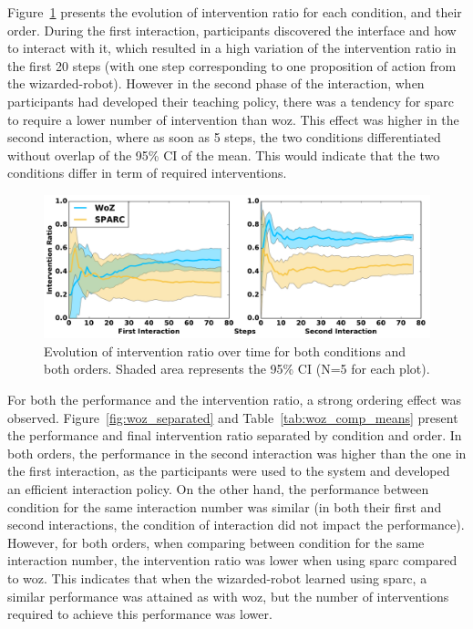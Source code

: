 Figure~\ref{fig:woz_ratio_time} presents the evolution of intervention ratio for each condition, and their order. During the first interaction, participants discovered the interface and how to interact with it, which resulted in a high variation of the intervention ratio in the first 20 steps (with one step corresponding to one proposition of action from the wizarded-robot). However in the second phase of the interaction, when participants had developed their teaching policy, there was a tendency for \gls{sparc} to require a lower number of intervention than \gls{woz}. This effect was higher in the second interaction, where as soon as 5 steps, the two conditions differentiated without overlap of the 95\% CI of the mean. This would indicate that the two conditions differ in term of required interventions.

\begin{figure}[ht]
	\centering
	\includegraphics[width=1.\textwidth]{ratio_time.pdf}
	\caption{Evolution of intervention ratio over time for both conditions and both orders. Shaded area represents the 95\% CI (N=5 for each plot).}
	\label{fig:woz_ratio_time}
\end{figure}

For both the performance and the intervention ratio, a strong ordering effect was observed. Figure~\ref{fig:woz_separated} and Table~\ref{tab:woz_comp_means} present the performance and final intervention ratio separated by condition and order. In both orders, the performance in the second interaction was higher than the one in the first interaction, as the participants were used to the system and developed an efficient interaction policy. On the other hand, the performance between condition for the same interaction number was similar (in both their first and second interactions, the condition of interaction did not impact the performance). However, for both orders, when comparing between condition for the same interaction number, the intervention ratio was lower when using \gls{sparc} compared to \gls{woz}. This indicates that when the wizarded-robot learned using \gls{sparc}, a similar performance was attained as with \gls{woz}, but the number of interventions required to achieve this performance was lower.

